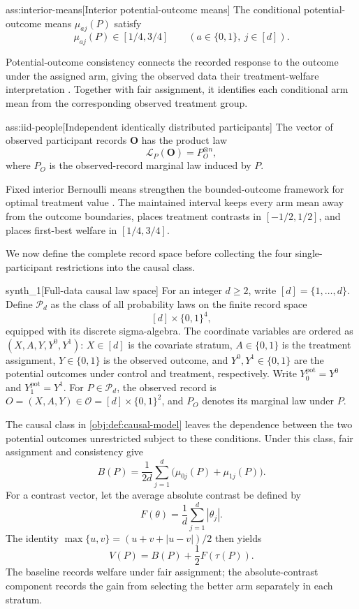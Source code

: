 \begin{assumptionv}{ass:interior-means}[Interior potential-outcome means]
The conditional potential-outcome means \(\mu_{aj}(P)\) satisfy
\[
\mu_{aj}(P)\in[1/4,3/4]
\qquad(a\in\{0,1\},\ j\in[d]).
\]
\end{assumptionv}

Potential-outcome consistency connects the recorded response to the outcome under the assigned arm, giving the observed data their treatment-welfare interpretation \citep{LuedtkeVanDerLaan2016OptimalValue}. Together with fair assignment, it identifies each conditional arm mean from the corresponding observed treatment group.

\begin{assumptionv}{ass:iid-people}[Independent identically distributed participants]
The vector of observed participant records \(\mathbf O\) has the product law
\[
\mathcal L_P(\mathbf O)=P_O^{\otimes n},
\]
where \(P_O\) is the observed-record marginal law induced by \(P\).
\end{assumptionv}

Fixed interior Bernoulli means strengthen the bounded-outcome framework for optimal treatment value \citep{LuedtkeVanDerLaan2016OptimalValue}. The maintained interval keeps every arm mean away from the outcome boundaries, places treatment contrasts in \([-1/2,1/2]\), and places first-best welfare in \([1/4,3/4]\).

We now define the complete record space before collecting the four single-participant restrictions into the causal class.

\begin{definitionv}{synth_1}[Full-data causal law space]
For an integer \(d\ge2\), write \([d]=\{1,\ldots,d\}\). Define \(\mathcal P_d\) as the class of all probability laws on the finite record space
\[
[d]\times\{0,1\}^4,
\]
equipped with its discrete sigma-algebra. The coordinate variables are ordered as \((X,A,Y,Y^0,Y^1)\): \(X\in[d]\) is the covariate stratum, \(A\in\{0,1\}\) is the treatment assignment, \(Y\in\{0,1\}\) is the observed outcome, and \(Y^0,Y^1\in\{0,1\}\) are the potential outcomes under control and treatment, respectively. Write \(Y^{\mathrm{pot}}_0=Y^0\) and \(Y^{\mathrm{pot}}_1=Y^1\). For \(P\in\mathcal P_d\), the observed record is \(O=(X,A,Y)\in\mathcal O=[d]\times\{0,1\}^2\), and \(P_O\) denotes its marginal law under \(P\).
\end{definitionv}

The causal class  in \cref{obj:def:causal-model} leaves the dependence between the two potential outcomes unrestricted subject to these conditions. Under this class, fair assignment and consistency give
\[
B(P)=\frac1{2d}\sum_{j=1}^d
\bigl(\mu_{0j}(P)+\mu_{1j}(P)\bigr).
\]
For a contrast vector, let the average absolute contrast  be defined by
\[
F(\theta)=\frac1d\sum_{j=1}^d|\theta_j|.
\]
The identity \(\max\{u,v\}=(u+v+|u-v|)/2\) then yields
\[
V(P)=B(P)+\frac12F(\tau(P)).
\]
The baseline records welfare under fair assignment; the absolute-contrast component records the gain from selecting the better arm separately in each stratum.

